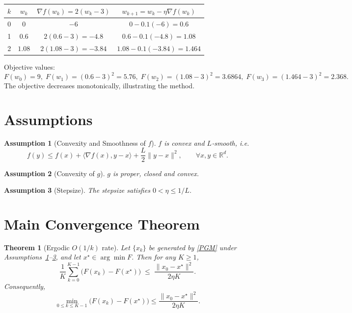\documentclass{article}
\newtheorem{theorem}{Theorem}
\newtheorem{assumption}{Assumption}
\newcommand{\grad}{\nabla}
\newcommand{\inner}[2]{\langle #1,#2\rangle}
\newcommand{\norm}[1]{\|#1\|}
\begin{document}
\begin{center}
\begin{tabular}{c|c|c|c}
$k$ & $w_{k}$ & $\grad f(w_{k})=2(w_{k}-3)$ & $w_{k+1}=w_{k}-\eta\grad f(w_{k})$ \\ \hline
0 & $0$ & $-6$ & $0-0.1(-6)=0.6$ \\
1 & $0.6$ & $2(0.6-3)=-4.8$ & $0.6-0.1(-4.8)=1.08$ \\
2 & $1.08$ & $2(1.08-3)=-3.84$ & $1.08-0.1(-3.84)=1.464$ \\
\end{tabular}
\end{center}
Objective values:
\[
F(w_{0})=9,\;F(w_{1})=(0.6-3)^{2}=5.76,\;F(w_{2})=(1.08-3)^{2}=3.6864,\;F(w_{3})=(1.464-3)^{2}=2.368.
\]
The objective decreases monotonically, illustrating the method.

\newpage
\section*{Assumptions}
\begin{assumption}[Convexity and Smoothness of $f$]\label{as:fsmooth}
$f$ is convex and $L$‑smooth, i.e.
\[
f(y)\le f(x)+\inner{\grad f(x)}{y-x}+\frac{L}{2}\norm{y-x}^{2},\qquad\forall x,y\in\mathbb R^{d}.
\]
\end{assumption}
\begin{assumption}[Convexity of $g$]\label{as:gconvex}
$g$ is proper, closed and convex.
\end{assumption}
\begin{assumption}[Stepsize]\label{as:stepsize}
The stepsize satisfies $0<\eta\le 1/L$.
\end{assumption}

\section*{Main Convergence Theorem}
\begin{theorem}[Ergodic $O(1/k)$ rate]\label{thm:ergodic}
Let $\{x_{k}\}$ be generated by \eqref{PGM} under Assumptions~\ref{as:fsmooth}–\ref{as:stepsize}, and let $x^{\star}\in\arg\min F$. Then for any $K\ge1$,
\[
\frac{1}{K}\sum_{k=0}^{K-1}\bigl(F(x_{k})-F(x^{\star})\bigr)
\;\le\;
\frac{\norm{x_{0}-x^{\star}}^{2}}{2\eta K}.
\tag{1}
\]
Consequently,
\[
\min_{0\le k\le K-1}\bigl(F(x_{k})-F(x^{\star})\bigr)\le
\frac{\norm{x_{0}-x^{\star}}^{2}}{2\eta K}.
\]
\end{theorem}
\end{document}
